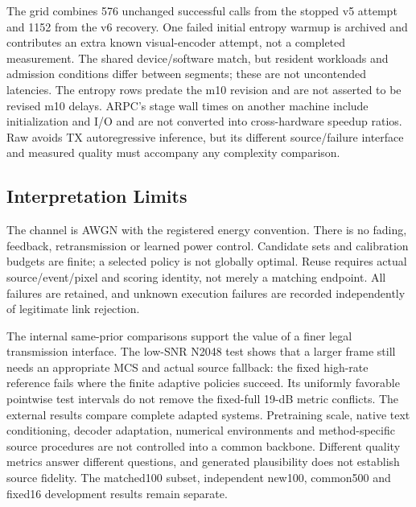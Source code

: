 The grid combines 576 unchanged successful calls from the stopped v5 attempt and 1152 from the v6 recovery. One failed initial entropy warmup is archived and contributes an extra known visual-encoder attempt, not a completed measurement. The shared device/software match, but resident workloads and admission conditions differ between segments; these are not uncontended latencies. The entropy rows predate the m10 revision and are not asserted to be revised m10 delays. ARPC's stage wall times on another machine include initialization and I/O and are not converted into cross-hardware speedup ratios. Raw avoids TX autoregressive inference, but its different source/failure interface and measured quality must accompany any complexity comparison.

\subsection{Interpretation Limits}
The channel is AWGN with the registered energy convention. There is no fading, feedback, retransmission or learned power control. Candidate sets and calibration budgets are finite; a selected policy is not globally optimal. Reuse requires actual source/event/pixel and scoring identity, not merely a matching endpoint. All failures are retained, and unknown execution failures are recorded independently of legitimate link rejection.

The internal same-prior comparisons support the value of a finer legal transmission interface. The low-SNR N2048 test shows that a larger frame still needs an appropriate MCS and actual source fallback: the fixed high-rate reference fails where the finite adaptive policies succeed. Its uniformly favorable pointwise test intervals do not remove the fixed-full 19-dB metric conflicts. The external results compare complete adapted systems. Pretraining scale, native text conditioning, decoder adaptation, numerical environments and method-specific source procedures are not controlled into a common backbone. Different quality metrics answer different questions, and generated plausibility does not establish source fidelity. The matched100 subset, independent new100, common500 and fixed16 development results remain separate.


